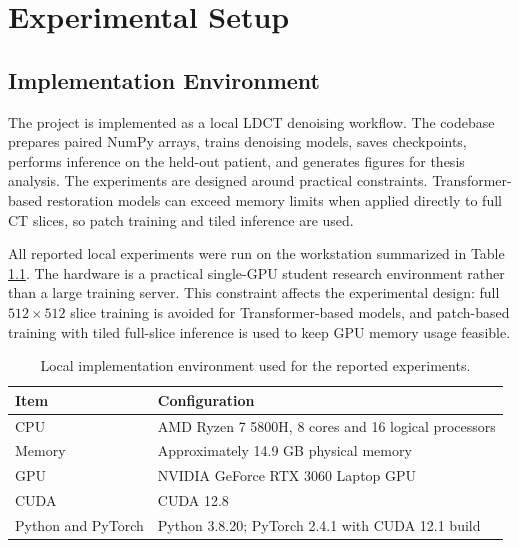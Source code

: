 \chapter{Experimental Setup}

\section{Implementation Environment}

The project is implemented as a local LDCT denoising workflow. The codebase prepares paired NumPy arrays, trains denoising models, saves checkpoints, performs inference on the held-out patient, and generates figures for thesis analysis. The experiments are designed around practical constraints. Transformer-based restoration models can exceed memory limits when applied directly to full CT slices, so patch training and tiled inference are used.

All reported local experiments were run on the workstation summarized in Table \ref{tab:environment}. The hardware is a practical single-GPU student research environment rather than a large training server. This constraint affects the experimental design: full \(512 \times 512\) slice training is avoided for Transformer-based models, and patch-based training with tiled full-slice inference is used to keep GPU memory usage feasible.

\begin{table}[!htbp]
    \centering
    \caption{Local implementation environment used for the reported experiments.}
    \renewcommand{\arraystretch}{1.25}
    \small
    \begin{tabular*}{\textwidth}{>{\raggedright\arraybackslash}p{}|>{\raggedright\arraybackslash}p{}}
        \hline
        Item & Configuration \\
        \hline
        CPU & AMD Ryzen 7 5800H, 8 cores and 16 logical processors \\
        \hline
        Memory & Approximately 14.9 GB physical memory \\
        \hline
        GPU & NVIDIA GeForce RTX 3060 Laptop GPU\\
        \hline
        CUDA & CUDA 12.8 \\
        \hline
        Python and PyTorch & Python 3.8.20; PyTorch 2.4.1 with CUDA 12.1 build \\
        \hline
    \end{tabular*}
    \label{tab:environment}
\end{table}

